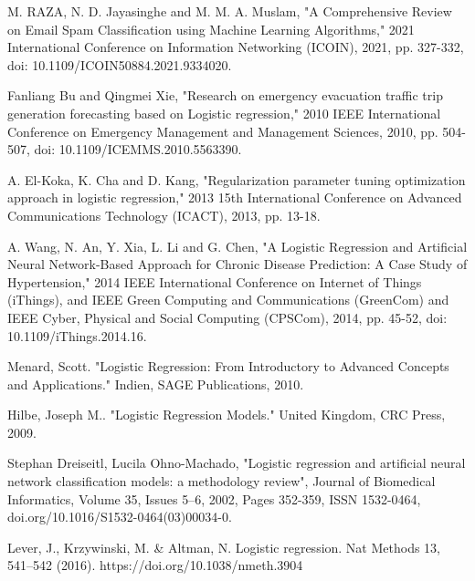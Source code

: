 \documentclass[conference]{IEEEtran}
\begin{document}



\begin{thebibliography}{00}

 M. RAZA, N. D. Jayasinghe and M. M. A. Muslam, "A Comprehensive Review on Email Spam Classification using Machine Learning Algorithms," 2021 International Conference on Information Networking (ICOIN), 2021, pp. 327-332, doi: 10.1109/ICOIN50884.2021.9334020.

 Fanliang Bu and Qingmei Xie, "Research on emergency evacuation traffic trip generation forecasting based on Logistic regression," 2010 IEEE International Conference on Emergency Management and Management Sciences, 2010, pp. 504-507, doi: 10.1109/ICEMMS.2010.5563390.

 A. El-Koka, K. Cha and D. Kang, "Regularization parameter tuning optimization approach in logistic regression," 2013 15th International Conference on Advanced Communications Technology (ICACT), 2013, pp. 13-18.

 A. Wang, N. An, Y. Xia, L. Li and G. Chen, "A Logistic Regression and Artificial Neural Network-Based Approach for Chronic Disease Prediction: A Case Study of Hypertension," 2014 IEEE International Conference on Internet of Things (iThings), and IEEE Green Computing and Communications (GreenCom) and IEEE Cyber, Physical and Social Computing (CPSCom), 2014, pp. 45-52, doi: 10.1109/iThings.2014.16.

 Menard, Scott. "Logistic Regression: From Introductory to Advanced Concepts and Applications." Indien, SAGE Publications, 2010.

 Hilbe, Joseph M.. "Logistic Regression Models." United Kingdom, CRC Press, 2009.

 Stephan Dreiseitl, Lucila Ohno-Machado, "Logistic regression and artificial neural network classification models: a methodology review", Journal of Biomedical Informatics, Volume 35, Issues 5–6, 2002, Pages 352-359, ISSN 1532-0464, doi.org/10.1016/S1532-0464(03)00034-0.

 Lever, J., Krzywinski, M. \& Altman, N. Logistic regression. Nat Methods 13, 541–542 (2016). https://doi.org/10.1038/nmeth.3904



\end{thebibliography}
\end{document}
